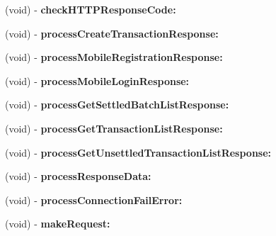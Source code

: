 \begin{DoxyCompactItemize}
\item 
\hypertarget{interface_auth_net_aa2e153da1cfc505f38f40bf9655cc4ea}{
(void) -\/ {\bfseries checkHTTPResponseCode:}}
\label{interface_auth_net_aa2e153da1cfc505f38f40bf9655cc4ea}

\item 
\hypertarget{interface_auth_net_af91d751ca806993485a47a6ee4fe0a47}{
(void) -\/ {\bfseries processCreateTransactionResponse:}}
\label{interface_auth_net_af91d751ca806993485a47a6ee4fe0a47}

\item 
\hypertarget{interface_auth_net_a13337790d2ddd12efd3b7433a2517b8f}{
(void) -\/ {\bfseries processMobileRegistrationResponse:}}
\label{interface_auth_net_a13337790d2ddd12efd3b7433a2517b8f}

\item 
\hypertarget{interface_auth_net_aca1b3aa607150e178380df25bbe2eec1}{
(void) -\/ {\bfseries processMobileLoginResponse:}}
\label{interface_auth_net_aca1b3aa607150e178380df25bbe2eec1}

\item 
\hypertarget{interface_auth_net_a6a40ec5037cdca764ae7431e749a6eaf}{
(void) -\/ {\bfseries processGetSettledBatchListResponse:}}
\label{interface_auth_net_a6a40ec5037cdca764ae7431e749a6eaf}

\item 
\hypertarget{interface_auth_net_acd8f21d835203aeb6ccab7e25ca54bec}{
(void) -\/ {\bfseries processGetTransactionListResponse:}}
\label{interface_auth_net_acd8f21d835203aeb6ccab7e25ca54bec}

\item 
\hypertarget{interface_auth_net_a1bad1337c6c097f0f84247deace273ef}{
(void) -\/ {\bfseries processGetUnsettledTransactionListResponse:}}
\label{interface_auth_net_a1bad1337c6c097f0f84247deace273ef}

\item 
\hypertarget{interface_auth_net_a2f178eb9b6600279042c87b3a79e133e}{
(void) -\/ {\bfseries processResponseData:}}
\label{interface_auth_net_a2f178eb9b6600279042c87b3a79e133e}

\item 
\hypertarget{interface_auth_net_a36bc65a5ec1b12f80648836e72cb0116}{
(void) -\/ {\bfseries processConnectionFailError:}}
\label{interface_auth_net_a36bc65a5ec1b12f80648836e72cb0116}

\item 
\hypertarget{interface_auth_net_abbf381b0e043831b6671d883bb395e91}{
(void) -\/ {\bfseries makeRequest:}}
\label{interface_auth_net_abbf381b0e043831b6671d883bb395e91}


\end{DoxyCompactItemize}
